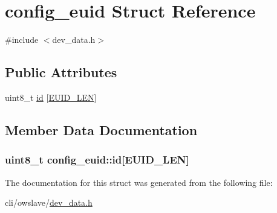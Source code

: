 \hypertarget{structconfig__euid}{\section{config\-\_\-euid Struct Reference}
\label{structconfig__euid}
}


{\ttfamily \#include $<$dev\-\_\-data.\-h$>$}

\subsection*{Public Attributes}
\begin{DoxyCompactItemize}
\item 
uint8\-\_\-t \hyperlink{structconfig__euid_a67bc2965559458837b905fb32ca769b6}{id} \mbox{[}\hyperlink{dev__data_8h_af380621fde5834c453e4b42ec0f813fb}{E\-U\-I\-D\-\_\-\-L\-E\-N}\mbox{]}
\end{DoxyCompactItemize}


\subsection{Member Data Documentation}
\hypertarget{structconfig__euid_a67bc2965559458837b905fb32ca769b6}{
\subsubsection[{id}]{\setlength{\rightskip}{0pt plus 5cm}uint8\-\_\-t config\-\_\-euid\-::id\mbox{[}{\bf E\-U\-I\-D\-\_\-\-L\-E\-N}\mbox{]}}}\label{structconfig__euid_a67bc2965559458837b905fb32ca769b6}


The documentation for this struct was generated from the following file\-:\begin{DoxyCompactItemize}
\item 
cli/owslave/\hyperlink{dev__data_8h}{dev\-\_\-data.\-h}\end{DoxyCompactItemize}
